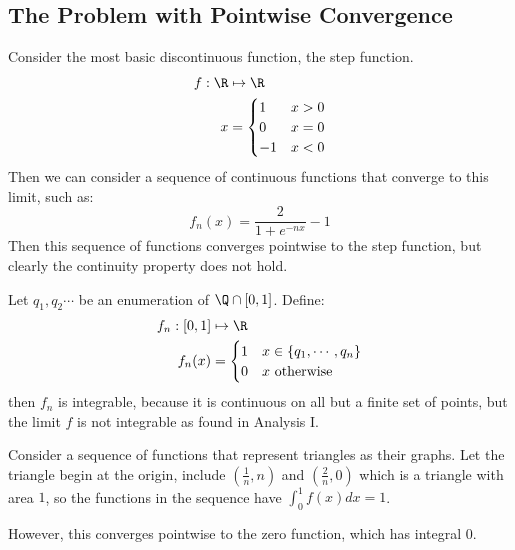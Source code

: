 \documentclass[../Main.tex]{subfiles}
\begin{document}
\subsection{The Problem with Pointwise Convergence}
\begin{example}
    Consider the most basic discontinuous function, the step function.
    \begin{align*}
        f : \R &\mapsto \R \\
        x &= 
        \begin{cases}
            1 & x > 0 \\
            0 & x = 0 \\
            -1 & x < 0
        \end{cases}
    \end{align*}
    Then we can consider a sequence of continuous functions that converge to this limit, such as:
    \begin{equation*}
        f_n(x) = \frac{2}{1 + e^{-nx}} - 1
    \end{equation*}
    Then this sequence of functions converges pointwise to the step function, but clearly the continuity property does not hold.
\end{example}
\begin{example}
    Let $q_1, q_2 \cdots$ be an enumeration of $\Q \cap [0, 1]$. Define:
    \begin{align*}
        f_n : [0, 1] &\mapsto \R \\
        f_n(x) &=
        \begin{cases}
            1 & x \in \{q_1, \cdots, q_n\} \\
            0 & x \text{ otherwise}
        \end{cases}
    \end{align*}    
    then $f_n$ is integrable, because it is continuous on all but a finite set of points, but the limit $f$ is not integrable as found in Analysis I.
\end{example}
\begin{example}
    Consider a sequence of functions that represent triangles as their graphs. Let the triangle begin at the origin, include $(\frac1n, n)$ and $(\frac2n, 0)$ which is a triangle with area $1$, so the functions in the sequence have $\int_0^1 f(x) dx = 1$.

    However, this converges pointwise to the zero function, which has integral 0.
\end{example}
\end{document}
